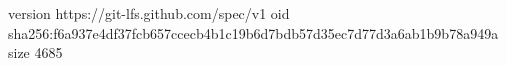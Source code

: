 version https://git-lfs.github.com/spec/v1
oid sha256:f6a937e4df37fcb657ccecb4b1c19b6d7bdb57d35ec7d77d3a6ab1b9b78a949a
size 4685
